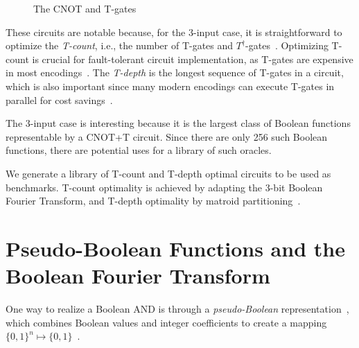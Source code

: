 \documentclass[a4paper]{article}
\makeatletter
\newcommand{\sublabel}[1]{\protected@edef\@currentlabel{\thefigure(\thesubfigure)}\label{#1}}
\makeatother
\begin{document}
\begin{figure}[t]
  \begin{minipage}{0.45\linewidth}
    \centering
    \scalebox{1.0} {
      
    }
    \sublabel{fig-sgate}
    \scalebox{1.0} {
      
    }
    \sublabel{fig-sdgate}
    \scalebox{1.0}{
      
    }
    \sublabel{fig-cnot}
  \end{minipage}
  \begin{minipage}{0.45\linewidth}
  \centering
    \scalebox{1.0} {
      
    }
    \sublabel{fig-tgate}
    \scalebox{1.0} {
      
    }
    \sublabel{fig-tdgate}
    \vspace{2cm}
  \end{minipage}
  \caption{The CNOT and T-gates}
  \label{fig-gates}
\end{figure}

These circuits are notable because, for the 3-input case, it is straightforward to optimize the {\it T-count}, i.e., the number of T-gates and $T^{\dagger}$-gates~\cite{amy-meet-in-middle}. Optimizing T-count is crucial for fault-tolerant circuit implementation, as T-gates are expensive in most encodings~\cite{bib-herr-lattice,bib-fowler-bridge}. The {\it T-depth} is the longest sequence of T-gates in a circuit, which is also important since many modern encodings can execute T-gates in parallel for cost savings~\cite{bib-google-ecc}.

The 3-input case is interesting because it is the largest class of Boolean functions representable by a CNOT+T circuit. Since there are only 256 such Boolean functions, there are potential uses for a library of such oracles.

We generate a library of T-count and T-depth optimal circuits to be used as benchmarks. T-count optimality is achieved by adapting the 3-bit Boolean Fourier Transform, and T-depth optimality by matroid partitioning~\cite{bib-amy-matroid}.

\section{Pseudo-Boolean Functions and the Boolean Fourier Transform}

One way to realize a Boolean AND is through a {\it pseudo-Boolean} representation~\cite{bib-barenco-elementary,bib-amy-cnot}, which combines Boolean values and integer coefficients to create a mapping $\{0,1\}^n \mapsto \{0,1\}$~\cite{bib-amy-rm}.
\end{document}
